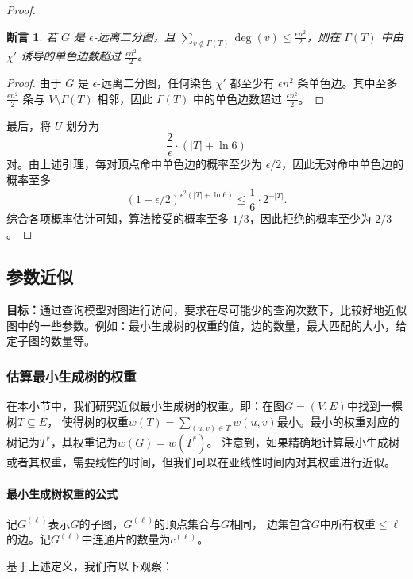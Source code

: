 \documentclass[lang=cn,newtx,10pt,scheme=chinese,chinesefont=nofont,citestyle=gb7714-2015, bibstyle=gb7714-2015]{elegantbook}
\newtheorem{claim}{断言}[chapter]   %
\begin{document}
\begin{refsection}
\begin{proof}
\begin{claim}
若 $G$ 是 $\epsilon$-远离二分图，且 $\sum_{v \notin \Gamma(T)} \deg(v) \le \frac{\epsilon n^2}{2}$，则在 $\Gamma(T)$ 中由 $\chi'$ 诱导的单色边数超过 $\frac{\epsilon n^2}{2}$。
\end{claim}

\begin{proof}
由于 $G$ 是 $\epsilon$-远离二分图，任何染色 $\chi'$ 都至少有 $\epsilon n^2$ 条单色边。其中至多 $\frac{\epsilon n^2}{2}$ 条与 $V \setminus \Gamma(T)$ 相邻，因此 $\Gamma(T)$ 中的单色边数超过 $\frac{\epsilon n^2}{2}$。
\end{proof}

最后，将 $U$ 划分为
$$
\frac{2}{\epsilon} \cdot \left(|T| + \ln 6\right)
$$
对。由上述引理，每对顶点命中单色边的概率至少为 $\epsilon/2$，因此无对命中单色边的概率至多
$$
(1 - \epsilon/2)^{\epsilon^2 (|T| + \ln 6)} \le \frac{1}{6} \cdot 2^{-|T|}.
$$
综合各项概率估计可知，算法接受的概率至多 $1/3$，因此拒绝的概率至少为 $2/3$。
\end{proof}

\subsection{参数近似}
\textbf{目标：}通过查询模型对图进行访问，要求在尽可能少的查询次数下，比较好地近似图中的一些参数。例如：最小生成树的权重的值，边的数量，最大匹配的大小，给定子图的数量等。

\subsubsection{估算最小生成树的权重}
在本小节中，我们研究近似最小生成树的权重。即：在图$G=(V,E)$中找到一棵树$T\subseteq E$，
使得树的权重$w(T)=\sum_{(u,v)\in T}w(u,v)$最小。最小的权重对应的树记为$T^*$，其权重记为$w(G)=w(T^*)$。
注意到，如果精确地计算最小生成树或者其权重，需要线性的时间，但我们可以在亚线性时间内对其权重进行近似。

\paragraph{最小生成树权重的公式}

\begin{definition}
    记$G^{(\ell)}$表示$G$的子图，$G^{(\ell)}$的顶点集合与$G$相同，
    边集包含$G$中所有权重$\le\ell$的边。记$G^{(\ell)}$中连通片的数量为$c^{(\ell)}$。
\end{definition}

基于上述定义，我们有以下观察：


\end{refsection}
\end{document}
